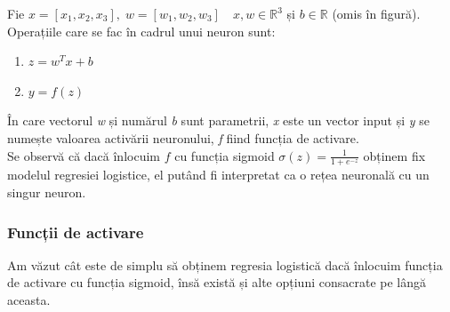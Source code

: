 Fie $x=[x_1,x_2,x_3], \; w=[w_1,w_2,w_3] \quad x,w \in \mathbb{R}^3$ și $b \in \mathbb{R}$ (omis în figură). Operațiile care se fac în cadrul unui neuron sunt:

\begin{enumerate}
\centering
\item $z=w^Tx + b$
\item $y=f(z)$
\end{enumerate}

În care vectorul \textit{w} și numărul \textit{b} sunt parametrii, \textit{x} este un vector input și \textit{y} se numește valoarea activării neuronului, \textit{f} fiind funcția de activare. \\
Se observă că dacă înlocuim $f$ cu funcția sigmoid $\displaystyle{\sigma(z)=\frac{1}{1 + e^{-z}}}$ obținem fix modelul regresiei logistice, el putând fi interpretat ca o rețea neuronală cu un singur neuron.

\subsubsection{Funcții de activare}
Am văzut cât este de simplu să obținem regresia logistică dacă înlocuim funcția de activare cu funcția sigmoid, însă există și alte opțiuni consacrate pe lângă aceasta.

